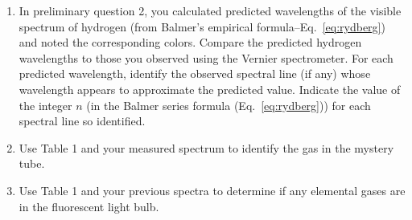\begin{enumerate}
\item In preliminary question 2, you calculated predicted wavelengths of
the visible spectrum of hydrogen (from Balmer's
empirical formula--Eq.~\ref{eq:rydberg}) and noted the corresponding colors.
Compare the predicted hydrogen wavelengths to those you observed
using the Vernier spectrometer.  For each predicted
wavelength, identify the observed spectral line (if any) whose
wavelength appears to approximate the predicted value.  Indicate the
value of the integer $n$ (in the Balmer series formula (Eq.~\ref{eq:rydberg})) for each
spectral line so identified.

\item Use Table 1 and your measured spectrum to identify the gas in the mystery tube.   

\item Use Table 1 and your previous spectra to determine if any elemental gases are in the fluorescent light bulb. 

\end{enumerate}

